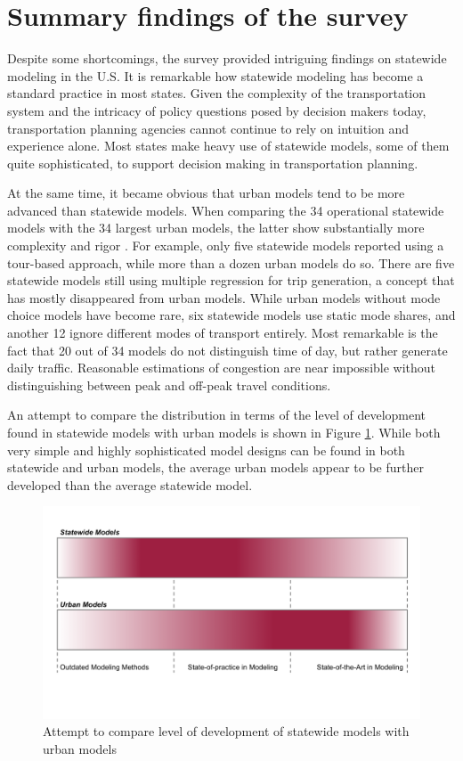 \section{Summary findings of the survey}

Despite some shortcomings, the survey provided intriguing findings on statewide modeling in the U.S. It is remarkable how statewide modeling has become a standard practice in most states. Given the complexity of the transportation system and the intricacy of policy questions posed by decision makers today, transportation planning agencies cannot continue to rely on intuition and experience alone. Most states make heavy use of statewide models, some of them quite sophisticated, to support decision making in transportation planning.

At the same time, it became obvious that urban models tend to be more advanced than statewide models. When comparing the 34 operational statewide models with the 34 largest urban models, the latter show substantially more complexity and rigor \citep{donnelly10}. For example, only five statewide models reported using a tour-based approach, while more than a dozen urban models do so. There are five statewide models still using multiple regression for trip generation, a concept that has mostly disappeared from urban models. While urban models without mode choice models have become rare, six statewide models use static mode shares, and another 12 ignore different modes of transport entirely. Most remarkable is the fact that 20 out of 34 models do not distinguish time of day, but rather generate daily traffic. Reasonable estimations of congestion are near impossible without distinguishing between peak and off-peak travel conditions.

An attempt to compare the distribution in terms of the level of development found in statewide models with urban models is shown in Figure \ref{fig:model-development-comparison}. While both very simple and highly sophisticated model designs can be found in both statewide and urban models, the average urban models appear to be further developed than the average statewide model.

\begin{figure}   %
\centering
\includegraphics[width=6.4in]{graphics/39-model-development-comparison}
\caption{Attempt to compare level of development of statewide models with urban models}
\label{fig:model-development-comparison}
\end{figure}

